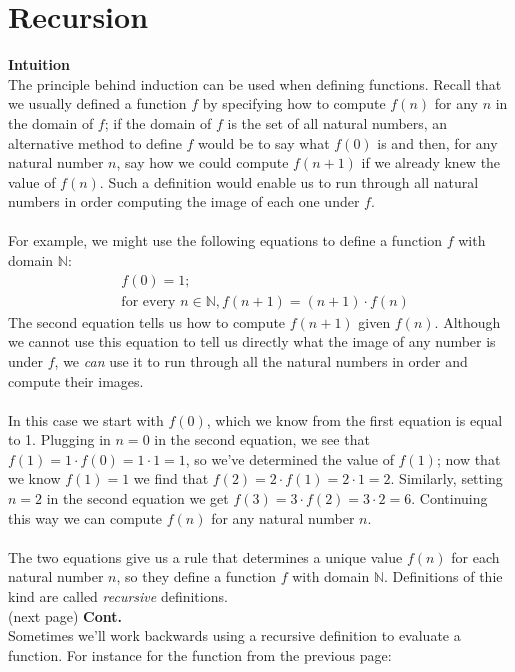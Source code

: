 \documentclass{report}
\theoremstyle{definition}
\begin{document}
\section{Recursion}
\textbf{Intuition}\\
The principle behind induction can be used when defining functions. Recall that we usually
defined a function $f$ by specifying how to compute $f(n)$ for any $n$ in the domain of $f$; if the domain of $f$ is the set of all natural numbers, an alternative method to define $f$ would be to
say what $f(0)$ is and then, for any natural number $n$, say how we could compute $f(n+1)$ if we already knew the value of $f(n)$. Such a definition would enable us to run through all natural
numbers in order computing the image of each one under $f$.\\
\vspace{1mm}\\
For example, we might use the following equations to define a function $f$ with domain $\mathbb N$:
\begin{align*}
&f(0)=1;\\
&\text{for every }n\in\mathbb N,f(n+1)=(n+1)\cdot f(n)
\end{align*}
The second equation tells us how to compute $f(n+1)$ given $f(n)$. Although we cannot use this equation to tell us directly what the image of any number is under $f$, 
we \textit{can} use it to run through all the natural numbers in order and compute their images.\\
\vspace{1mm}\\
In this case we start with $f(0)$, which we know from the first equation is equal to 1.
Plugging in $n=0$ in the second equation, we see that $f(1)=1\cdot f(0)=1\cdot1=1$, so we've determined the value of $f(1)$; now that we know $f(1)=1$ we find that $f(2)=2\cdot f(1)=2\cdot1=2$.
Similarly, setting $n=2$ in the second equation we get $f(3)=3\cdot f(2)=3\cdot2=6$. Continuing this way we can compute $f(n)$ for any natural number $n$.\\
\vspace{1mm}\\
The two equations give us a rule that determines a unique value $f(n)$ for each natural number $n$, so they define a function $f$ with domain $\mathbb N$. 
Definitions of thie kind are called \textit{recursive} definitions.\\
(next page)\newpage
\noindent\textbf{Cont.}\\
Sometimes we'll work backwards using a recursive definition to evaluate a function. For instance for the function from the previous page:
\end{document}
